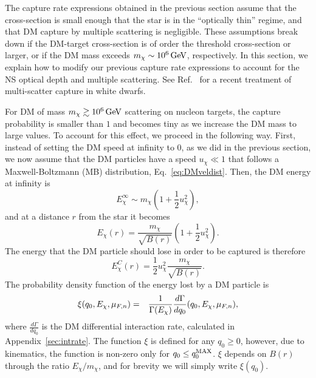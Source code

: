 The capture rate expressions obtained in the previous section assume that the cross-section is small enough that the star is in the ``optically thin'' regime, and that DM  capture by multiple scattering is negligible. These assumptions break down if the DM-target cross-section is of order the threshold cross-section or larger, or if the DM mass exceeds $m_\chi \sim 10^6{\rm \,GeV}$, respectively. In this section, we explain how to modify our previous capture rate expressions to account for the NS optical depth and multiple scattering.  See Ref.~\citep{Dasgupta:2019juq_Darkmattercapture} for a recent treatment of multi-scatter capture in white dwarfs.


For DM of mass $m_\chi\gtrsim 10^6{\rm \,GeV}$ scattering on nucleon targets, the capture probability is smaller than $1$ and becomes tiny as we increase the DM mass to large values. To account for this effect, we proceed in the following way. First, instead of setting the DM speed at infinity to $0$, as we did in the previous section, we now assume that the DM particles have a speed $u_\chi\ll 1$ that follows a Maxwell-Boltzmann (MB) distribution, Eq.~\ref{eq:DMveldist}. 
Then, the DM energy at infinity is 
\begin{equation}
    E^\infty_\chi \sim m_\chi \left(1+\frac{1}{2}u_\chi^2\right), 
\end{equation}
and at a distance $r$ from the star it becomes
\begin{equation}
    E_\chi(r) = \frac{m_\chi}{\sqrt{B(r)}} \left(1+\frac{1}{2}u_\chi^2\right).
    \label{eq:Echir}
\end{equation}
The energy that the DM particle should lose in order to be captured is therefore
\begin{equation}
    E_\chi^C(r) =  \frac{1}{2}u_\chi^2 \frac{m_\chi}{\sqrt{B(r)}}. 
\end{equation} 
The probability density function of the energy lost by a DM particle is 
\begin{eqnarray}
\xi(q_0,E_\chi,\mu_{F,n}) &=& \frac{1}{\Gamma(E_\chi)}\frac{d\Gamma}{dq_0}(q_0,E_\chi,\mu_{F,n}),\label{eq:normintrate}
\end{eqnarray}
where $\frac{d\Gamma}{dq_0}$ is the DM differential interaction rate, calculated in Appendix~\ref{sec:intrate}. 
The function $\xi$ is defined for any $q_0\ge 0$, however, due to kinematics, the function is non-zero only for $q_0\le q_0^{\rm MAX}$. $\xi$ depends on $B(r)$ through the ratio $E_\chi/m_\chi$, and for brevity we will simply write $\xi(q_0)$.



